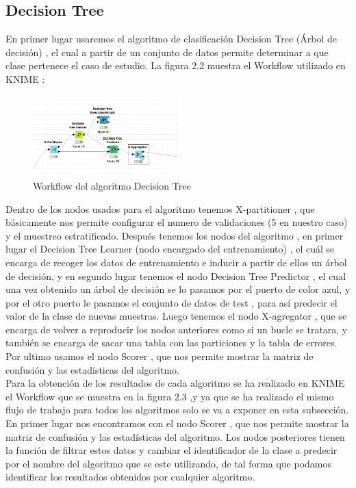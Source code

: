 	\subsection{Decision Tree}

	En primer lugar usaremos el algoritmo de clasificación Decision Tree (Árbol de decisión) \cite{Wikipedia2} , el cual a partir 
	de un conjunto de datos permite determinar a que clase pertenece el caso de estudio. La 
	figura 2.2 muestra el Workflow utilizado en KNIME :
	
	\begin{figure}[htb]
		\centering
		\includegraphics[width=0.5\textwidth]{./imagenes/6}
		\caption{Workflow del algoritmo Decision Tree} \label{fig:35}
	\end{figure}
	

	Dentro de los nodos usados para el algoritmo tenemos X-partitioner , que básicamente nos permite configurar el numero de validaciones
	(5 en nuestro caso) y el muestreo estratificado. Después tenemos los nodos del algoritmo , en primer lugar el Decision Tree Learner (nodo encargado del entrenamiento)
	, el cuál se encarga de recoger los datos de entrenamiento e inducir a partir de ellos un árbol de decisión, y en segundo lugar tenemos el nodo Decision Tree Predictor , el cual
	una vez obtenido un árbol de decisión se lo pasamos por el puerto de color azul, y por el otro puerto le pasamos el conjunto de datos de test , para así predecir
	el valor de la clase de nuevas muestras. Luego tenemos el nodo X-agregator  , que se encarga de volver a reproducir los nodos anteriores como si un bucle se tratara,
	y también se encarga de sacar una tabla con las particiones y la tabla de errores. Por ultimo usamos el nodo Scorer , que nos permite mostrar la matriz de confusión y las estadísticas del algoritmo. \\

	Para la obtención de los resultados de cada algoritmo se ha realizado en KNIME el Workflow que se muestra en la figura 2.3 ,y ya que se ha realizado el mismo flujo de trabajo para todos los algoritmos
	solo se va a exponer en esta subsección. En primer lugar nos encontramos con el nodo Scorer , que nos permite mostrar la matriz de confusión y las estadísticas del algoritmo. Los nodos posteriores
	tienen la función de filtrar estos datos y cambiar el identificador de la clase a predecir por el nombre del algoritmo que se este utilizando, de tal forma que podamos identificar los 
	resultados obtenidos por cualquier algoritmo. \\
	
